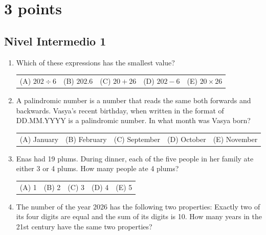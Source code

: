 
\usetikzlibrary{calc}
\usetikzlibrary{angles,quotes}
\usetikzlibrary{shapes.geometric}




	\tableofcontents

	\section{3 points}
	\subsection{Nivel Intermedio 1}

	\begin{enumerate}
		\item Which of these expressions has the smallest value?

		\begin{center}
			\begin{tabular}{ccccc}
				(A) $202 \div 6$ & (B) $202.6$ & (C) $20+26$ & (D) $202-6$ & (E) $20\times 26$
			\end{tabular}
		\end{center}

		\item A palindromic number is a number that reads the same both forwards and backwards. Vasya's recent birthday, when written in the format of DD.MM.YYYY is a palindromic number. In what month was Vasya born?

		\begin{center}
			\begin{tabular}{ccccc}
				(A) January & (B) February & (C) September & (D) October & (E) November
			\end{tabular}
		\end{center}

		\item Enas had 19 plums. During dinner, each of the five people in her family ate either 3 or 4 plums. How many people ate 4 plums?

		\begin{center}
			\begin{tabular}{ccccc}
				(A) 1 & (B) 2 & (C) 3 & (D) 4 & (E) 5
			\end{tabular}
		\end{center}

		\item The number of the year 2026 has the following two properties: Exactly two of its four digits are equal and the sum of its digits is 10. How many years in the 21st century have the same two properties?


\end{enumerate}
